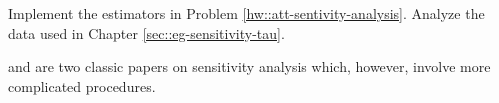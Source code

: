 \begin{HomeworkProblem}[R code]\label{exr:18-5}

Implement the estimators in Problem \ref{hw::att-sentivity-analysis}.
Analyze the data used in Chapter \ref{sec::eg-sensitivity-tau}.


\end{HomeworkProblem}

\begin{HomeworkProblem}\label{exr:18-6}

 \citet{Rosenbaum::1983JRSSB} and \citet{imbens2003sensitivity} are two classic papers on sensitivity analysis which, however, involve more complicated procedures.



\end{HomeworkProblem}
